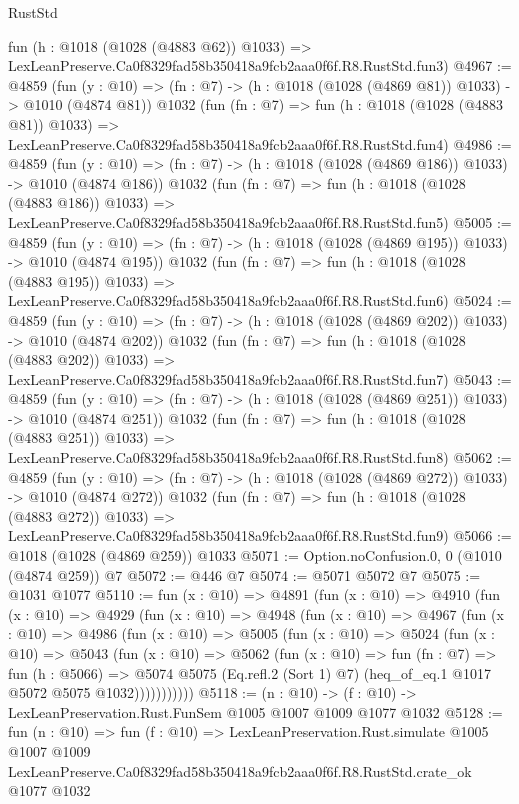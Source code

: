\begin{lexlean}{RustStd}
\begin{coremodule}
    fun (h : @1018 (@1028 (@4883 @62)) @1033) =>
    LexLeanPreserve.Ca0f8329fad58b350418a9fcb2aaa0f6f.R8.RustStd.fun3)
@4967 := @4859
    (fun (y : @10) => (fn : @7) -> (h : @1018 (@1028 (@4869 @81)) @1033) -> @1010 (@4874 @81))
    @1032
    (fun (fn : @7) =>
    fun (h : @1018 (@1028 (@4883 @81)) @1033) =>
    LexLeanPreserve.Ca0f8329fad58b350418a9fcb2aaa0f6f.R8.RustStd.fun4)
@4986 := @4859
    (fun (y : @10) => (fn : @7) -> (h : @1018 (@1028 (@4869 @186)) @1033) -> @1010 (@4874 @186))
    @1032
    (fun (fn : @7) =>
    fun (h : @1018 (@1028 (@4883 @186)) @1033) =>
    LexLeanPreserve.Ca0f8329fad58b350418a9fcb2aaa0f6f.R8.RustStd.fun5)
@5005 := @4859
    (fun (y : @10) => (fn : @7) -> (h : @1018 (@1028 (@4869 @195)) @1033) -> @1010 (@4874 @195))
    @1032
    (fun (fn : @7) =>
    fun (h : @1018 (@1028 (@4883 @195)) @1033) =>
    LexLeanPreserve.Ca0f8329fad58b350418a9fcb2aaa0f6f.R8.RustStd.fun6)
@5024 := @4859
    (fun (y : @10) => (fn : @7) -> (h : @1018 (@1028 (@4869 @202)) @1033) -> @1010 (@4874 @202))
    @1032
    (fun (fn : @7) =>
    fun (h : @1018 (@1028 (@4883 @202)) @1033) =>
    LexLeanPreserve.Ca0f8329fad58b350418a9fcb2aaa0f6f.R8.RustStd.fun7)
@5043 := @4859
    (fun (y : @10) => (fn : @7) -> (h : @1018 (@1028 (@4869 @251)) @1033) -> @1010 (@4874 @251))
    @1032
    (fun (fn : @7) =>
    fun (h : @1018 (@1028 (@4883 @251)) @1033) =>
    LexLeanPreserve.Ca0f8329fad58b350418a9fcb2aaa0f6f.R8.RustStd.fun8)
@5062 := @4859
    (fun (y : @10) => (fn : @7) -> (h : @1018 (@1028 (@4869 @272)) @1033) -> @1010 (@4874 @272))
    @1032
    (fun (fn : @7) =>
    fun (h : @1018 (@1028 (@4883 @272)) @1033) =>
    LexLeanPreserve.Ca0f8329fad58b350418a9fcb2aaa0f6f.R8.RustStd.fun9)
@5066 := @1018 (@1028 (@4869 @259)) @1033
@5071 := Option.noConfusion.{0, 0} (@1010 (@4874 @259)) @7
@5072 := @446 @7
@5074 := @5071 @5072 @7
@5075 := @1031 @1077
@5110 := fun (x : @10) =>
  @4891
    (fun (x : @10) =>
    @4910
      (fun (x : @10) =>
      @4929
        (fun (x : @10) =>
        @4948
          (fun (x : @10) =>
          @4967
            (fun (x : @10) =>
            @4986
              (fun (x : @10) =>
              @5005
                (fun (x : @10) =>
                @5024
                  (fun (x : @10) =>
                  @5043
                    (fun (x : @10) =>
                    @5062
                      (fun (x : @10) =>
                      fun (fn : @7) =>
                      fun (h : @5066) =>
                      @5074
                        @5075
                        (Eq.refl.{2} (Sort 1) @7)
                        (heq_of_eq.{1} @1017 @5072 @5075 @1032)))))))))))
@5118 := (n : @10) -> (f : @10) -> LexLeanPreservation.Rust.FunSem @1005 @1007 @1009 @1077 @1032
@5128 := fun (n : @10) =>
  fun (f : @10) =>
  LexLeanPreservation.Rust.simulate
    @1005
    @1007
    @1009
    LexLeanPreserve.Ca0f8329fad58b350418a9fcb2aaa0f6f.R8.RustStd.crate_ok
    @1077
    @1032
\end{coremodule}
\end{lexlean}
